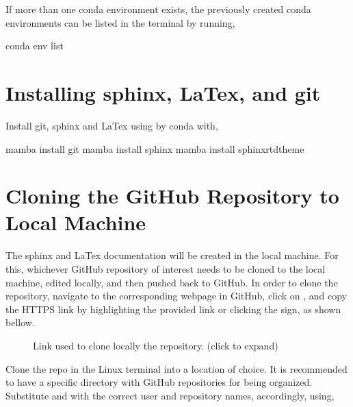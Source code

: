 \documentclass[letterpaper,10pt,english]{sphinxhowto}
\let\sphinxpxdimen\pdfpxdimen\else\newdimen\sphinxpxdimen
\begin{document}
\sphinxAtStartPar
If more than one conda environment exists, the previously created conda environments can be listed in the terminal by running,

\begin{sphinxVerbatim}[commandchars=\\\{\}]
\PYGZdl{} conda env list
\end{sphinxVerbatim}


\section{Installing sphinx, LaTex, and git}
\label{\detokenize{index:installing-sphinx-latex-and-git}}
\sphinxAtStartPar
Install git, sphinx and LaTex using by conda with,

\begin{sphinxVerbatim}[commandchars=\\\{\}]
\PYGZdl{} mamba install git
\PYGZdl{} mamba install sphinx
\PYGZdl{} mamba install sphinx\PYGZus{}rtd\PYGZus{}theme
\end{sphinxVerbatim}


\section{Cloning the GitHub Repository to Local Machine}
\label{\detokenize{index:cloning-the-github-repository-to-local-machine}}
\sphinxAtStartPar
The sphinx and LaTex documentation will be created in the local machine. For this, whichever GitHub repository of interest needs to be cloned to the local machine, edited locally, and then pushed back to GitHub. In order to clone the repository, navigate to the corresponding webpage in GitHub, click on , and copy the HTTPS link by highlighting the provided link or clicking the  sign, as shown bellow.

\begin{figure}[htbp]
\centering
\capstart

\noindent\sphinxincludegraphics[width=600\sphinxpxdimen]{{github_repo_clone}.png}
\caption{Link used to clone locally the repository. (click to expand)}\label{\detokenize{index:id1}}\end{figure}

\sphinxAtStartPar
Clone the repo in the Linux terminal into a location of choice. It is recommended to have a specific directory with GitHub repositories for being organized. Substitute  and  with the correct user and repository names, accordingly, using,
\end{document}
